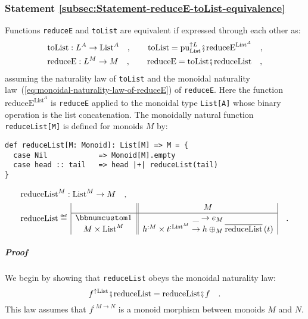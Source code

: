 \subsubsection{Statement \label{subsec:Statement-reduceE-toList-equivalence}\ref{subsec:Statement-reduceE-toList-equivalence}}

Functions \lstinline!reduceE! and \lstinline!toList! are equivalent
if expressed through each other as:
\begin{align}
 & \text{toList}:L^{A}\rightarrow\text{List}^{A}\quad,\quad\quad\text{toList}=\text{pu}_{\text{List}}^{\uparrow L}\bef\text{reduceE}^{\text{List}^{A}}\quad,\label{eq:toList-via-reduceE}\\
 & \text{reduceE}:L^{M}\rightarrow M\quad,\quad\quad\text{reduceE}=\text{toList}\bef\text{reduceList}\quad,\label{eq:reduceE-via-toList}
\end{align}
assuming the naturality law of \lstinline!toList! and the monoidal
naturality law~(\ref{eq:monoidal-naturality-law-of-reduceE}) of
\lstinline!reduceE!. Here the function $\text{reduceE}^{\text{List}^{A}}$
is \lstinline!reduceE! applied to the monoidal type \lstinline!List[A]!
whose binary operation is the list concatenation. The monoidally natural
function \lstinline!reduceList[M]! is defined for monoids $M$ by:
\begin{lstlisting}
def reduceList[M: Monoid]: List[M] => M = {
  case Nil            => Monoid[M].empty
  case head :: tail   => head |+| reduceList(tail)
}
\end{lstlisting}
\begin{align*}
 & \text{reduceList}^{M}:\text{List}^{M}\rightarrow M\quad,\\
 & \text{reduceList}\triangleq\,\begin{array}{|c||c|}
 & M\\
\hline \bbnum 1 & \_\rightarrow e_{M}\\
M\times\text{List}^{M} & h^{:M}\times t^{:\text{List}^{M}}\rightarrow h\oplus_{M}\overline{\text{reduceList}}\left(t\right)
\end{array}\quad.
\end{align*}


\subparagraph{Proof}

We begin by showing that \lstinline!reduceList! obeys the monoidal
naturality law:
\[
f^{\uparrow\text{List}}\bef\text{reduceList}=\text{reduceList}\bef f\quad.
\]
This law assumes that $f^{:M\rightarrow N}$ is a monoid morphism
between monoids $M$ and $N$. 


